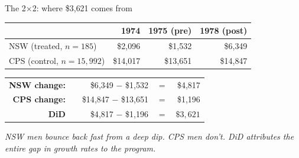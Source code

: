 \documentclass[11pt,aspectratio=169]{beamer}
\begin{document}
\begin{frame}{The 2$\times$2: where \$3{,}621 comes from}
\vspace{0.0em}
\begin{center}
\small
\renewcommand{\arraystretch}{1.5}
\begin{tabular}{@{}lrrr@{}}
\toprule
        & \textbf{1974}    & \textbf{1975 (pre)}    & \textbf{1978 (post)}    \\
\midrule
NSW (treated, $n=185$)   & \$2{,}096   & \cellcolor{accent!25}\$1{,}532    & \cellcolor{accent!25}\$6{,}349 \\
CPS (control, $n=15{,}992$) & \$14{,}017 & \cellcolor{ocean!25}\$13{,}651 & \cellcolor{ocean!25}\$14{,}847 \\
\bottomrule
\end{tabular}
\end{center}

\vspace{0.6em}
\begin{center}
\small
\begin{tabular}{@{}r@{\,\,}c@{\,\,}r@{\,\,}c@{\,\,}r@{}}
\textcolor{accent}{\textbf{NSW change:}}   & & \textcolor{accent}{\$6{,}349 $-$ \$1{,}532}       & $=$ & \textcolor{accent}{\$4{,}817} \\
\textcolor{ocean}{\textbf{CPS change:}}    & & \textcolor{ocean}{\$14{,}847 $-$ \$13{,}651}      & $=$ & \textcolor{ocean}{\$1{,}196} \\
\midrule
\textbf{DiD}                                & & \textcolor{accent}{\$4{,}817} $-$ \textcolor{ocean}{\$1{,}196} & $=$ & $\boxed{\$3{,}621}$ \\
\end{tabular}
\end{center}

\vspace{0.6em}
\begin{center}
\Large
{}
\end{center}
\vspace{0.2em}
\begin{center}
\small\color{warmgray}\itshape
NSW men bounce back fast from a deep dip. \;CPS men don't. \;DiD attributes the entire gap in growth rates to the program.
\end{center}
\end{frame}
\end{document}
